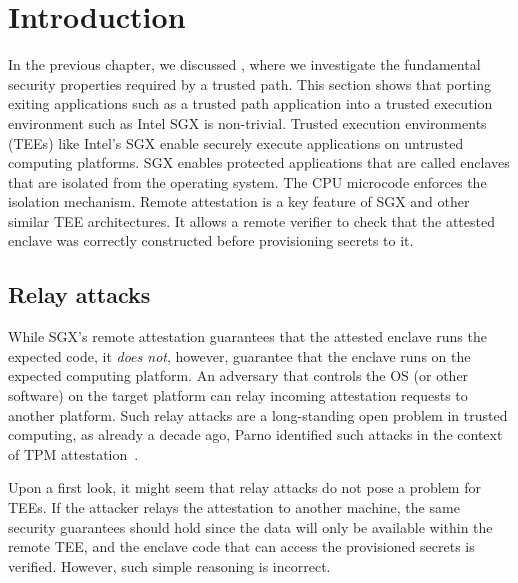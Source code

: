 \section{Introduction}
\label{sec:intro}


In the previous chapter, we discussed \protection, where we investigate the fundamental security properties required by a trusted path. This section shows that porting exiting applications such as a trusted path application into a trusted execution environment such as Intel SGX is non-trivial. Trusted execution environments (TEEs) like Intel's SGX enable securely execute applications on untrusted computing platforms. SGX enables protected applications that are called enclaves that are isolated from the operating system. The CPU microcode enforces the isolation mechanism. Remote attestation is a key feature of SGX and other similar TEE architectures. It allows a remote verifier to check that the attested enclave was correctly constructed before provisioning secrets to it. 


\subsection{Relay attacks}  While SGX's remote attestation guarantees that the attested enclave runs the expected code, it \emph{does not}, however,  guarantee that the enclave runs on the expected computing platform. An adversary that controls the OS (or other software) on the target platform can relay incoming attestation requests to another platform. Such relay attacks are a long-standing open problem in trusted computing, as already a decade ago, Parno identified such attacks in the context of TPM attestation~\cite{parno2008bootstrapping}.


Upon a first look, it might seem that relay attacks do not pose a problem for TEEs. If the attacker relays the attestation to another machine, the same security guarantees should hold since the data will only be available within the remote TEE, and the enclave code that can access the provisioned secrets is verified. However, such simple reasoning is incorrect. 

